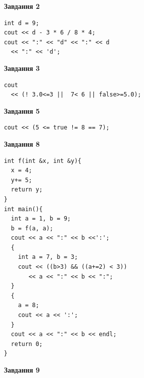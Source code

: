 \documentclass[12pt, ukrainian]{article}
\begin{document}
{\begin {large}
\begin{minipage}[t]{7.0cm}
\end{minipage}
\vline \hspace{1mm}
\begin{minipage}[t]{11.0cm}

\begin{center}
\textbf{Завдання 2}
\end{center}
\vspace{-8mm}

\begin{verbatim}
int d = 9;
cout << d - 3 * 6 / 8 * 4;
cout << ":" << "d" << ":" << d 
  << ":" << 'd';
\end{verbatim}



\begin{center}
\textbf{Завдання 3}
\end{center}
\vspace{-8mm}

\begin{verbatim}
cout 
  << (! 3.0<=3 ||  7< 6 || false>=5.0);
\end{verbatim}



\begin{center}
\textbf{Завдання 5}
\end{center}
\vspace{-8mm}

\begin{verbatim}
cout << (5 <= true != 8 == 7);
\end{verbatim}



\begin{center}
\textbf{Завдання 8}
\end{center}
\vspace{-8mm}

\begin{verbatim}
int f(int &x, int &y){
  x = 4;
  y+= 5;
  return y;
}
int main(){
  int a = 1, b = 9;
  b = f(a, a);
  cout << a << ":" << b <<':';
  {
    int a = 7, b = 3;
    cout << ((b>3) && ((a+=2) < 3))
       << a << ":" << b << ":";
  }
  {
    a = 8;
    cout << a << ':';
  }
  cout << a << ":" << b << endl;
  return 0;
}
\end{verbatim}

\end{minipage}


\begin{minipage}[t]{7.0cm}

\begin{center}
\textbf{Завдання 9}
\end{center}
\vspace{-8mm}


\end{minipage}
\end{large}}
\end{document}
